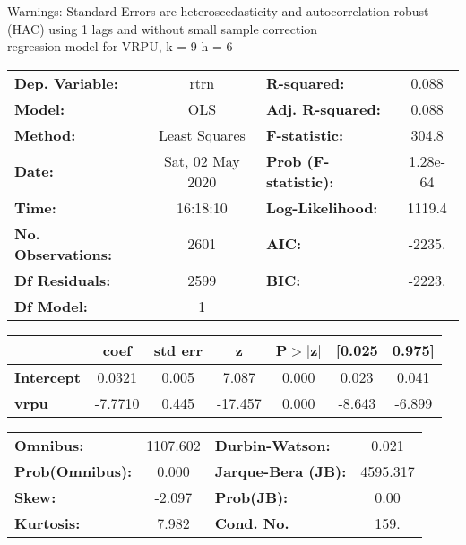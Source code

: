 Warnings: \newline
 [1] Standard Errors are heteroscedasticity and autocorrelation robust (HAC) using 1 lags and without small sample correction\\ 

regression model for VRPU, k = 9 h = 6\begin{center}
\begin{tabular}{lclc}
\toprule
\textbf{Dep. Variable:}    &       rtrn       & \textbf{  R-squared:         } &     0.088   \\
\textbf{Model:}            &       OLS        & \textbf{  Adj. R-squared:    } &     0.088   \\
\textbf{Method:}           &  Least Squares   & \textbf{  F-statistic:       } &     304.8   \\
\textbf{Date:}             & Sat, 02 May 2020 & \textbf{  Prob (F-statistic):} &  1.28e-64   \\
\textbf{Time:}             &     16:18:10     & \textbf{  Log-Likelihood:    } &    1119.4   \\
\textbf{No. Observations:} &        2601      & \textbf{  AIC:               } &    -2235.   \\
\textbf{Df Residuals:}     &        2599      & \textbf{  BIC:               } &    -2223.   \\
\textbf{Df Model:}         &           1      & \textbf{                     } &             \\
\bottomrule
\end{tabular}
\begin{tabular}{lcccccc}
                   & \textbf{coef} & \textbf{std err} & \textbf{z} & \textbf{P$> |$z$|$} & \textbf{[0.025} & \textbf{0.975]}  \\
\midrule
\textbf{Intercept} &       0.0321  &        0.005     &     7.087  &         0.000        &        0.023    &        0.041     \\
\textbf{vrpu}      &      -7.7710  &        0.445     &   -17.457  &         0.000        &       -8.643    &       -6.899     \\
\bottomrule
\end{tabular}
\begin{tabular}{lclc}
\textbf{Omnibus:}       & 1107.602 & \textbf{  Durbin-Watson:     } &    0.021  \\
\textbf{Prob(Omnibus):} &   0.000  & \textbf{  Jarque-Bera (JB):  } & 4595.317  \\
\textbf{Skew:}          &  -2.097  & \textbf{  Prob(JB):          } &     0.00  \\
\textbf{Kurtosis:}      &   7.982  & \textbf{  Cond. No.          } &     159.  \\
\bottomrule
\end{tabular}
\end{center}

